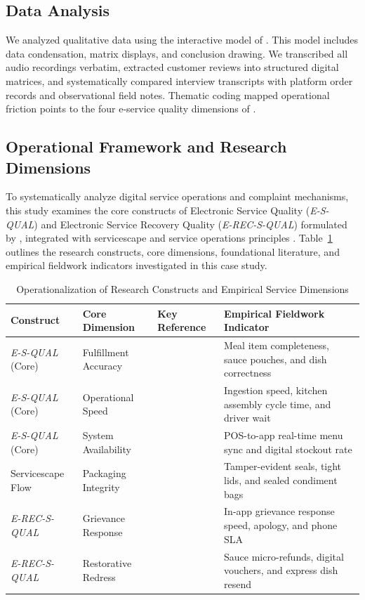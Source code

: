 \documentclass{jomas}
\begin{document}
\subsection{Data Analysis}
We analyzed qualitative data using the interactive model of \textcite{miles2014qualitative}. This model includes data condensation, matrix displays, and conclusion drawing. We transcribed all audio recordings verbatim, extracted customer reviews into structured digital matrices, and systematically compared interview transcripts with platform order records and observational field notes. Thematic coding mapped operational friction points to the four e-service quality dimensions of \textcite{parasuraman2005esqual}.

\subsection{Operational Framework and Research Dimensions}
To systematically analyze digital service operations and complaint mechanisms, this study examines the core constructs of Electronic Service Quality (\textit{E-S-QUAL}) and Electronic Service Recovery Quality (\textit{E-REC-S-QUAL}) formulated by \textcite{parasuraman2005esqual}, integrated with servicescape and service operations principles \parencite{bitner1992servicescapes,chase1994failsafe,smith1999servicerecovery}. Table~\ref{tab:operational-dimensions} outlines the research constructs, core dimensions, foundational literature, and empirical fieldwork indicators investigated in this case study.

\begin{table}[H]
\caption{Operationalization of Research Constructs and Empirical Service Dimensions}
\label{tab:operational-dimensions}
\centering
\small
\setlength{\tabcolsep}{3.5pt}
\begin{tabularx}{\textwidth}{p{2.6cm} p{3.0cm} p{3.8cm} X}
\toprule
\textbf{Construct} & \textbf{Core Dimension} & \textbf{Key Reference} & \textbf{Empirical Fieldwork Indicator} \\
\midrule
\textit{E-S-QUAL} (Core) & Fulfillment Accuracy & \textcite{parasuraman2005esqual} & Meal item completeness, sauce pouches, and dish correctness \\
\textit{E-S-QUAL} (Core) & Operational Speed & \textcite{parasuraman2005esqual} & Ingestion speed, kitchen assembly cycle time, and driver wait \\
\textit{E-S-QUAL} (Core) & System Availability & \textcite{parasuraman2005esqual} & POS-to-app real-time menu sync and digital stockout rate \\
Servicescape Flow & Packaging Integrity & \textcite{bitner1992servicescapes} & Tamper-evident seals, tight lids, and sealed condiment bags \\
\textit{E-REC-S-QUAL} & Grievance Response & \textcite{parasuraman2005esqual} & In-app grievance response speed, apology, and phone SLA \\
\textit{E-REC-S-QUAL} & Restorative Redress & \textcite{smith1999servicerecovery} & Sauce micro-refunds, digital vouchers, and express dish resend \\
\bottomrule
\end{tabularx}
\end{table}
\end{document}
